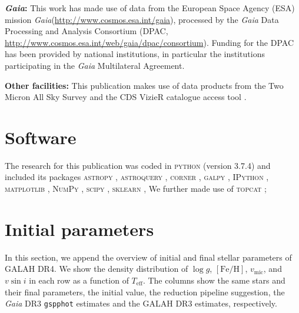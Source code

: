\documentclass[
  journal=pasa,
  manuscript=research-paper, %
  year=2024,
  volume=37
]{cup-journal}
\newcommand{\Teff}{$T_\mathrm{eff}$\xspace}
\newcommand{\logg}{$\log g$\xspace}
\newcommand{\feh}{$\mathrm{[Fe/H]}$\xspace}
\newcommand{\vmic}{$v_\mathrm{mic}$\xspace}
\newcommand{\vsini}{$v \sin i$\xspace}
\newcommand{\Gaia}{\textit{Gaia}\xspace}
\begin{document}
\textbf{\Gaia: } This work has made use of data from the European Space Agency (ESA) mission \Gaia (\url{http://www.cosmos.esa.int/gaia}), processed by the \Gaia Data Processing and Analysis Consortium (DPAC, \url{http://www.cosmos.esa.int/web/gaia/dpac/consortium}). Funding for the DPAC has been provided by national institutions, in particular the institutions participating in the \Gaia Multilateral Agreement. 

\textbf{Other facilities:} This publication makes use of data products from the Two Micron All Sky Survey \citep{Skrutskie2006} and the CDS VizieR catalogue access tool \citep{Vizier2000}.

\section*{Software}

The research for this publication was coded in \textsc{python} (version 3.7.4) and included its packages
\textsc{astropy} \citep[v. 3.2.2;][]{Robitaille2013,PriceWhelan2018},
\textsc{astroquery} \citep[v. 0.4;][]{Ginsburg2019},
\textsc{corner} \citep[v. 2.0.1;][]{corner},
\textsc{galpy} \citep[version 1.6.0;][]{Bovy2015},
\textsc{IPython} \citep[v. 7.8.0;][]{ipython},
\textsc{matplotlib} \citep[v. 3.1.3;][]{matplotlib},
\textsc{NumPy} \citep[v. 1.17.2;][]{numpy},
\textsc{scipy} \citep[version 1.3.1;][]{scipy},
\textsc{sklearn} \citep[v. 0.21.3;][]{scikit-learn},
We further made use of \textsc{topcat} \citep[version 4.7;][]{Taylor2005};




\newpage

\appendix

\section{Initial parameters}

In this section, we append the overview of initial and final stellar parameters of GALAH DR4. We show the density distribution of \logg, \feh, \vmic, and \vsini in each row as a function of \Teff. The columns show the same stars and their final parameters, the initial value, the reduction pipeline suggestion, the \Gaia DR3 \texttt{gspphot} estimates and the GALAH DR3 estimates, respectively.
\end{document}
